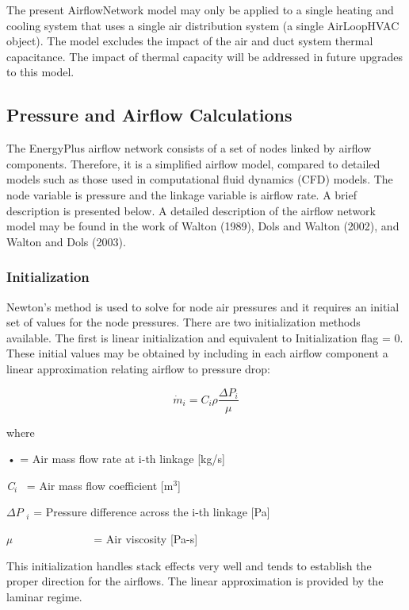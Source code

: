 The present AirflowNetwork model may only be applied to a single heating and cooling system that uses a single air distribution system (a single AirLoopHVAC object). The model excludes the impact of the air and duct system thermal capacitance. The impact of thermal capacity will be addressed in future upgrades to this model.

\subsection{Pressure and Airflow Calculations}\label{pressure-and-airflow-calculations}

The EnergyPlus airflow network consists of a set of nodes linked by airflow components. Therefore, it is a simplified airflow model, compared to detailed models such as those used in computational fluid dynamics (CFD) models. The node variable is pressure and the linkage variable is airflow rate. A brief description is presented below. A detailed description of the airflow network model may be found in the work of Walton (1989), Dols and Walton (2002), and Walton and Dols (2003).

\subsubsection{Initialization}\label{initialization}

Newton's method is used to solve for node air pressures and it requires an initial set of values for the node pressures. There are two initialization methods available. The first is linear initialization and equivalent to Initialization flag = 0. These initial values may be obtained by including in each airflow component a linear approximation relating airflow to pressure drop:

\begin{equation}
  \dot{m}_{i} = C_{i}\rho\frac{\Delta P_i}{\mu}
\end{equation}

where

\(\mathop {{m_i}}\limits^ \bullet\) = Air mass flow rate at i-th linkage {[}kg/s{]}

\emph{C\(_{i}\)}~ = Air mass flow coefficient {[}m\(^{3}\){]}

\(\Delta P\) \(_{i}\) = Pressure difference across the i-th linkage {[}Pa{]}

\emph{µ~~~}~~~~~~~~~~~ = Air viscosity {[}Pa-s{]}

This initialization handles stack effects very well and tends to establish the proper direction for the airflows. The linear approximation is provided by the laminar regime.

